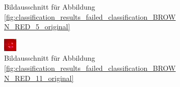 \begin{figure}[h!]
\begin{subfigure}[b]{0.2\textwidth}
                \caption{Bildausschnitt für Abbildung \ref{fig:classification_results_failed_classification_BROWN_RED_5_original}}
                \label{fig:classification_results_failed_classification_BROWN_RED_5_roi}
        \end{subfigure}
        \hfill
        \begin{subfigure}[b]{0.2\textwidth}
                \raggedright
                \includegraphics[width=1.0\linewidth]{../common/04_results/resources/classification/failed_classification_BROWN_RED_11_roi.png}
                \caption{Bildausschnitt für Abbildung \ref{fig:classification_results_failed_classification_BROWN_RED_11_original}}
                \label{fig:classification_results_failed_classification_BROWN_RED_11_roi}
        \end{subfigure}
        \hfill
        \begin{subfigure}[b]{0.2\textwidth}
                \raggedright

\end{subfigure}
\end{figure}
